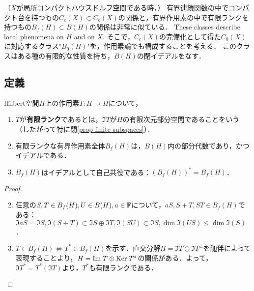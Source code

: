 \documentclass[uplatex,dvipdfmx]{jsreport}
\begin{document}
\begin{tcolorbox}[colframe=ForestGreen, colback=ForestGreen!10!white,breakable,colbacktitle=ForestGreen!40!white,coltitle=black,fonttitle=\bfseries\sffamily,
title=]
    （$X$が局所コンパクトハウスドルフ空間である時，）
    有界連続関数の中でコンパクト台を持つもの$C_c(X)\subset C_b(X)$の関係と，有界作用素の中で有限ランクを持つもの$B_f(H)\subset B(H)$の関係は非常に似ている．
    These classes describe local phenomena on $H$ and on $X$.\cite{AnalysisNow}
    そこで，$C_c(X)$の完備化として得た$C_0(X)$に対応するクラス"$B_0(H)$"を，作用素論でも構成することを考える．
    このクラスはある種の有限的な性質を持ち，$B(H)$の閉イデアルをなす．
\end{tcolorbox}

\subsection{定義}

\begin{definition}
    Hilbert空間$H$上の作用素$T:H\to H$について，
    \begin{enumerate}
        \item $T$が\textbf{有限ランク}であるとは，$\Im T$が$H$の有限次元部分空間であることをいう（したがって特に閉\ref{prop-finite-subspaces}）．
        \item 有限ランクな有界作用素全体$B_f(H)$は，$B(H)$内の部分代数であり，かつイデアルである．
        \item $B_f(H)$はイデアルとして自己共役である：$(B_f(H))^*=B_f(H)$．
    \end{enumerate}
\end{definition}
\begin{proof}\mbox{}
    \begin{enumerate}\setcounter{enumi}{1}
        \item 任意の$S,T\in B_f(H),U\in B(H),a\in\mathbb{F}$について，$aS,S+T,ST\in B_f(H)$である：$\Im aS=\Im S,\Im(S+T)\subset\Im S\oplus\Im T,\Im(SU)\subset\Im S,\dim\Im(US)\le\dim\Im(S)$．
        \item $T\in B_f(H)\Leftrightarrow T^*\in B_f(H)$を示す．直交分解$H=\Im T\oplus\Im T^\perp$を随伴によって表現することより，$H=\mathrm{Im}\; T\oplus\mathrm{Ker}\; T^*$の関係がある．よって，$\Im T^*=T^*(\Im T)$より，$T^*$も有限ランクである．
    \end{enumerate}
\end{proof}
\end{document}

